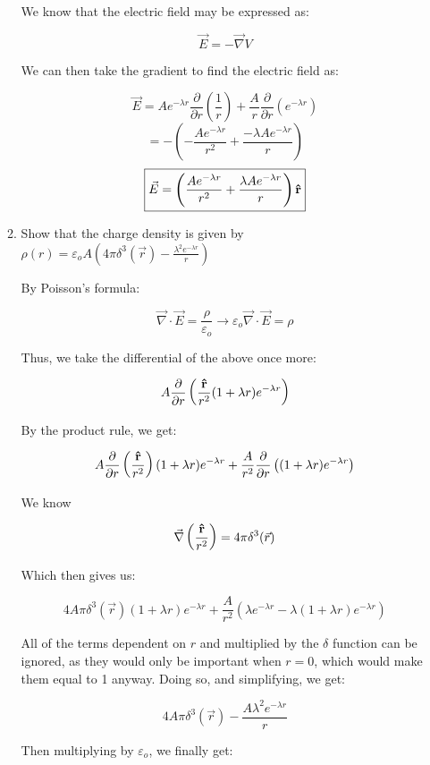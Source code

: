 \begin{enumerate}
\begin{enumerate}
        We know that the electric field may be expressed as:

        $$\vec{E}=-\vec{\nabla}V$$

        We can then take the gradient to find the electric field as:

        $$\vec{E}=Ae^{-\lambda r}\frac{\partial}{\partial r}\left( \frac{1}{r} \right)+\frac{A}{r}\frac{\partial}{\partial r}\left( e^{-\lambda r}\right)$$
      $$=-\left( -\frac{Ae^{-\lambda r}}{r^2}+\frac{-\lambda Ae^{-\lambda r}}{r}\right)$$
      $$\boxed{\vec{E}=\left(\frac{Ae^{-\lambda r}}{r^2}+\frac{\lambda Ae^{-\lambda r}}{r}\right)\bold{\hat{r}}}$$

      \item Show that the charge density is given by $\rho(r)=\varepsilon_oA\left( 4\pi\delta^3(\vec{r})-\frac{\lambda^2e^{-\lambda r}}{r} \right)$

        By Poisson's formula:

        $$\vec{\nabla}\cdot\vec{E}=\frac{\rho}{\varepsilon_o}\rightarrow\varepsilon_o\vec{\nabla}\cdot\vec{E}=\rho$$

        Thus, we take the differential of the above once more:

        $$A\frac{\partial}{\partial r}\left( \frac{\bold{\hat{r}}}{r^2}(1+\lambda r)e^{-\lambda r}\right)$$

        By the product rule, we get:

      $$A\frac{\partial}{\partial r}\left( \frac{\bold{\hat{r}}}{r^2}\right)(1+\lambda r)e^{-\lambda r}+\frac{A}{r^2}\frac{\partial}{\partial r}\left((1+\lambda r)e^{-\lambda r}\right)$$

      We know 

      $$\vec{\nabla}\left(\frac{\bold{\hat{r}}}{r^2}\right)=4\pi\delta^3(\vec{r})$$

      Which then gives us:

      $$4A\pi\delta^3(\vec{r})(1+\lambda r)e^{-\lambda r}+\frac{A}{r^2}\left(\lambda e^{-\lambda r}-\lambda(1+\lambda r)e^{-\lambda r}\right)$$

      All of the terms dependent on $r$ and multiplied by the $\delta$ function can be ignored, as they would only be important when $r=0$, which would make them equal to 1 anyway. Doing so, and simplifying, we get:

      $$4A\pi\delta^3(\vec{r})-\frac{A\lambda^2e^{-\lambda r}}{r}$$

      Then multiplying by $\varepsilon_o$, we finally get:


\end{enumerate}
\end{enumerate}
